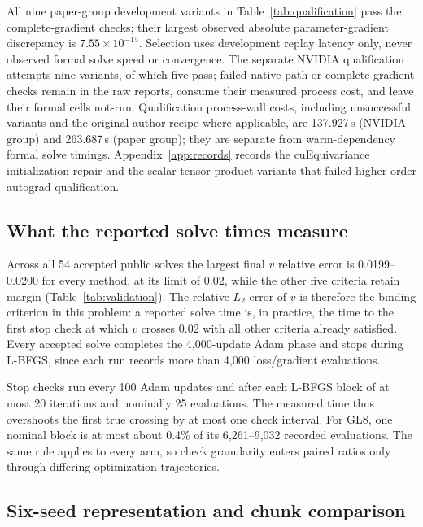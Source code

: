 \documentclass[11pt]{article}
\begin{document}
All nine paper-group development variants in Table~\ref{tab:qualification}
pass the complete-gradient checks; their largest observed absolute
parameter-gradient discrepancy is $7.55\times10^{-15}$. Selection uses
development replay latency only, never observed formal solve speed or
convergence. The separate NVIDIA qualification attempts nine variants, of
which five pass; failed native-path or complete-gradient checks remain in
the raw reports, consume their measured process cost, and leave their
formal cells not-run. Qualification process-wall costs, including
unsuccessful variants and the original author recipe where applicable, are
137.927\,s (NVIDIA group) and 263.687\,s (paper group); they are separate
from warm-dependency formal solve timings. Appendix~\ref{app:records}
records the cuEquivariance initialization repair and the scalar
tensor-product variants that failed higher-order autograd qualification.

\subsection{What the reported solve times measure}
Across all 54 accepted public solves the largest final $v$ relative error
is 0.0199--0.0200 for every method, at its limit of 0.02, while the other
five criteria retain margin (Table~\ref{tab:validation}). The relative
$L_2$ error of $v$ is therefore the binding criterion in this problem: a
reported solve time is, in practice, the time to the first stop check at
which $v$ crosses 0.02 with all other criteria already satisfied. Every
accepted solve completes the 4,000-update Adam phase and stops during
L-BFGS, since each run records more than 4,000 loss/gradient evaluations.

Stop checks run every 100 Adam updates and after each L-BFGS block of at
most 20 iterations and nominally 25 evaluations. The measured time thus
overshoots the first true crossing by at most one check interval. For GL8,
one nominal block is at most about 0.4\% of its 6,261--9,032 recorded
evaluations. The same rule applies to every arm, so check granularity
enters paired ratios only through differing optimization trajectories.

\subsection{Six-seed representation and chunk comparison}\label{sec:sixseed}
\end{document}
